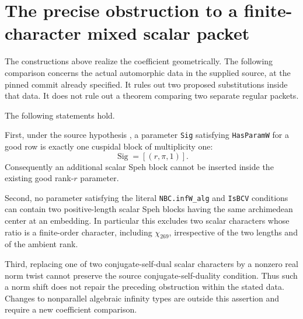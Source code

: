 \section{The precise obstruction to a finite-character mixed scalar packet}
\label{sec:mixed-packet-gate}

The constructions above realize the coefficient geometrically.
The following comparison concerns the actual automorphic data in
the supplied source, at the pinned commit already specified.
It rules out two proposed substitutions inside that data.  It
does not rule out a theorem comparing two separate regular packets.

\begin{proposition}
\label{AC-G37}
The following statements hold.

First, under the source hypothesis
, a parameter
\texttt{Sig} satisfying \texttt{HasParamW} for a good row is
exactly one cuspidal block of multiplicity one:
\[
                  \operatorname{Sig}=[(r,\pi,1)].       \tag{G37.1}
\]
Consequently an additional scalar Speh block cannot be inserted
inside the existing good rank-$r$ parameter.

Second, no parameter satisfying the literal
\texttt{NBC.infW\_alg} and \texttt{IsBCV} conditions can contain
two positive-length scalar Speh blocks having the same
archimedean center at an embedding.  In particular this excludes
two scalar characters whose ratio is a finite-order character,
including $\chi_{269}$, irrespective of the two lengths and
of the ambient rank.

Third, replacing one of two conjugate-self-dual scalar characters
by a nonzero real norm twist cannot preserve the source
conjugate-self-duality condition.  Thus such a norm shift does
not repair the preceding obstruction within the stated data.
Changes to nonparallel algebraic infinity types are outside this
assertion and require a new coefficient comparison.
\end{proposition}
